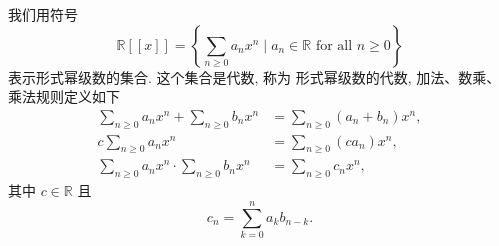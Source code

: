 \documentclass[punct]{ctexbeamer}
\newtheorem{defi}[thm]{定义}
\newcommand{\blue}{\textcolor{blue}}
\begin{document}
\begin{frame}
我们用符号
$$
\mathbb{R}[[x]]=\left\{\sum_{n \geq 0} a_{n} x^{n} \mid a_{n} \in \mathbb{R} \text { for all } n \geq 0\right\}
$$表示形式幂级数的集合. 这个集合是代数, 称为\alert{ 形式幂级数的代数}, 加法、数乘、乘法规则定义如下
$$
\begin{aligned}
    \sum_{n \geq 0} a_{n} x^{n}+\sum_{n \geq 0} b_{n} x^{n} &=\sum_{n \geq 0}\left(a_{n}+b_{n}\right) x^{n}, \\
    c \sum_{n \geq 0} a_{n} x^{n} &=\sum_{n \geq 0}\left(c a_{n}\right) x^{n}, \\
    \sum_{n \geq 0} a_{n} x^{n} \cdot \sum_{n \geq 0} b_{n} x^{n} &=\sum_{n \geq 0} c_{n} x^{n},
\end{aligned}
$$
其中 $c \in \mathbb{R}$ 且
$$
c_{n}=\sum_{k=0}^{n} a_{k} b_{n-k}.
$$
\end{frame}
\end{document}
